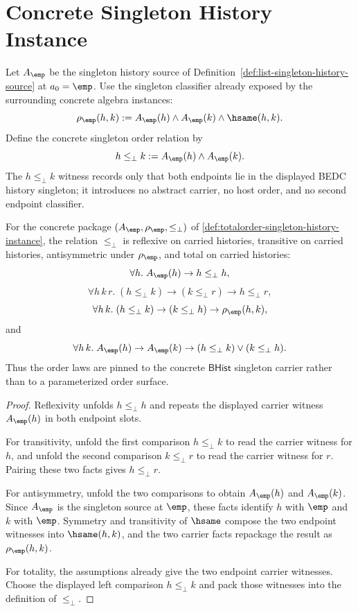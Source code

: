 \section{Concrete Singleton History Instance}
\label{sec:totalorder-singleton-history-instance}

\begin{definition}
\label{def:totalorder-singleton-history-instance}
Let $A_{\emp}$ be the singleton history source of
Definition~\ref{def:list-singleton-history-source} at $a_0=\emp$. Use the
singleton classifier already exposed by the surrounding concrete algebra
instances:
$$
\rho_{\emp}(h,k):=
A_{\emp}(h)\land A_{\emp}(k)\land\hsame(h,k).
$$
Define the concrete singleton order relation by
$$
h\le_{\bot}k:=A_{\emp}(h)\land A_{\emp}(k).
$$
The $h\le_{\bot}k$ witness records only that both endpoints lie in the
displayed BEDC history singleton; it introduces no abstract carrier, no host
order, and no second endpoint classifier.
\end{definition}

\begin{theorem}
\label{thm:totalorder-singleton-history-laws}
For the concrete package $(A_{\emp},\rho_{\emp},\le_{\bot})$ of
\autoref{def:totalorder-singleton-history-instance}, the relation
$\le_{\bot}$ is reflexive on carried histories, transitive on carried
histories, antisymmetric under $\rho_{\emp}$, and total on carried histories:
$$
\forall h.\; A_{\emp}(h)\to h\le_{\bot}h,
$$
$$
\forall h\,k\,r.\;
(h\le_{\bot}k)\to(k\le_{\bot}r)\to h\le_{\bot}r,
$$
$$
\forall h\,k.\;
(h\le_{\bot}k)\to(k\le_{\bot}h)\to\rho_{\emp}(h,k),
$$
and
$$
\forall h\,k.\; A_{\emp}(h)\to A_{\emp}(k)\to
(h\le_{\bot}k)\lor(k\le_{\bot}h).
$$
Thus the order laws are pinned to the concrete $\mathsf{BHist}$ singleton
carrier rather than to a parameterized order surface.
\end{theorem}
\begin{proof}
Reflexivity unfolds $h\le_{\bot}h$ and repeats the displayed carrier witness
$A_{\emp}(h)$ in both endpoint slots.

For transitivity, unfold the first comparison $h\le_{\bot}k$ to read the
carrier witness for $h$, and unfold the second comparison $k\le_{\bot}r$ to
read the carrier witness for $r$. Pairing these two facts gives
$h\le_{\bot}r$.

For antisymmetry, unfold the two comparisons to obtain $A_{\emp}(h)$ and
$A_{\emp}(k)$. Since $A_{\emp}$ is the singleton source at $\emp$, these facts
identify $h$ with $\emp$ and $k$ with $\emp$. Symmetry and transitivity of
$\hsame$ compose the two endpoint witnesses into $\hsame(h,k)$, and the two
carrier facts repackage the result as $\rho_{\emp}(h,k)$.

For totality, the assumptions already give the two endpoint carrier witnesses.
Choose the displayed left comparison $h\le_{\bot}k$ and pack those witnesses
into the definition of $\le_{\bot}$.
\end{proof}

